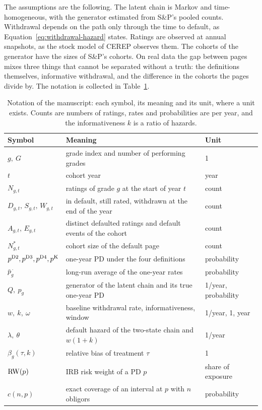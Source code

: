 The assumptions are the following. The latent chain is Markov and time-homogeneous, with the generator estimated from S\&P's pooled counts. Withdrawal depends on the path only through the time to default, as Equation~\eqref{eq:withdrawal-hazard} states. Ratings are observed at annual snapshots, as the stock model of CEREP observes them. The cohorts of the generator have the sizes of S\&P's cohorts. On real data the gap between pages mixes three things that cannot be separated without a truth: the definitions themselves, informative withdrawal, and the difference in the cohorts the pages divide by. The notation is collected in Table~\ref{tab:notation}.

\begin{table}[htbp]
\centering
\footnotesize
\caption{Notation of the manuscript: each symbol, its meaning and its unit, where a unit exists. Counts are numbers of ratings, rates and probabilities are per year, and the informativeness $k$ is a ratio of hazards.}
\label{tab:notation}
\begin{tabular}{lll}
\toprule
Symbol & Meaning & Unit \\
\midrule
$g,\ G$ & grade index and number of performing grades & 1 \\
$t$ & cohort year & year \\
$N_{g,t}$ & ratings of grade $g$ at the start of year $t$ & count \\
$D_{g,t},\,S_{g,t},\,W_{g,t}$ & in default, still rated, withdrawn at the end of the year & count \\ %
$A_{g,t},\,E_{g,t}$ & distinct defaulted ratings and default events of the cohort & count \\
$N^{\ast}_{g,t}$ & cohort size of the default page & count \\
$p^{\mathrm{D2}},p^{\mathrm{D3}},p^{\mathrm{D4}},p^{\mathrm{K}}$ & one-year PD under the four definitions & probability \\
$\bar p^{\,\cdot}_g$ & long-run average of the one-year rates & probability \\
$Q,\ p_g$ & generator of the latent chain and its true one-year PD & 1/year, probability \\
$w,\ k,\ \omega$ & baseline withdrawal rate, informativeness, window & 1/year, 1, year \\
$\lambda,\ \theta$ & default hazard of the two-state chain and $w(1+k)$ & 1/year \\
$\beta_g(\tau,k)$ & relative bias of treatment $\tau$ & 1 \\
$\mathrm{RW}(p)$ & IRB risk weight of a PD $p$ & share of exposure \\
$c(n,p)$ & exact coverage of an interval at $p$ with $n$ obligors & probability \\
\bottomrule
\end{tabular}
\end{table}
